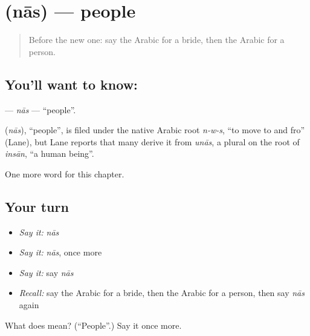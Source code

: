 \section[\texorpdfstring{\ar{ناس} (nās)}{ناس (nās)}]{ (nās) — people}

\label{lesson:AR-C275-nas}



\begin{quote}
Before the new one: say the Arabic for a bride, then the Arabic for a person.
\end{quote}

\subsection*{You'll want to know: }
\textbf{} — \emph{nās} — \textquotedblleft{}people\textquotedblright{}.

\begin{cousinweb}
\textbf{} (\emph{nās}), \textquotedblleft{}people\textquotedblright{}, is filed under the native Arabic root \emph{n-w-s}, \textquotedblleft{}to move to and fro\textquotedblright{} (Lane), but Lane reports that many derive it from \emph{unās}, a plural on the root of \emph{insān}, \textquotedblleft{}a human being\textquotedblright{}.
\end{cousinweb}

\begin{grammarlens}[title={What you've built}]
One more word for this chapter.
\end{grammarlens}

\subsection*{Your turn}
\begin{itemize}
\raggedright
  \item \emph{Say it:} \emph{nās}
  \item \emph{Say it:} \emph{nās}, once more
  \item \emph{Say it:} say \emph{nās}
  \item \emph{Recall:} say the Arabic for a bride, then the Arabic for a person, then say \emph{nās} again
\end{itemize}

\begin{tcolorbox}[breakable,colback=teal!4,colframe=teal!35!black,title={Before you move on}]
What does  mean? (\textquotedblleft{}People\textquotedblright{}.) Say it once more.
\end{tcolorbox}
